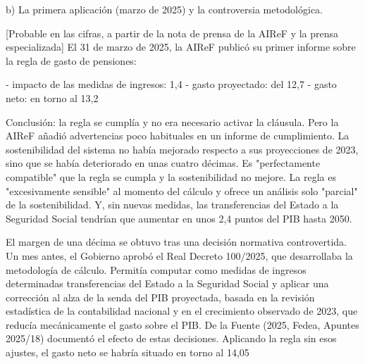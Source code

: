 \documentclass[10pt,a4paper]{article}
\begin{document}
b) La primera aplicación (marzo de 2025) y la controversia metodológica.

[Probable en las cifras, a partir de la nota de prensa de la AIReF y la prensa especializada] El 31 de marzo de 2025, la AIReF publicó su primer informe sobre la regla de gasto de pensiones:

- impacto de las medidas de ingresos: 1,4%
- gasto proyectado: del 12,7%
- gasto neto: en torno al 13,2%

Conclusión: la regla se cumplía y no era necesario activar la cláusula. Pero la AIReF añadió advertencias poco habituales en un informe de cumplimiento. La sostenibilidad del sistema no había mejorado respecto a sus proyecciones de 2023, sino que se había deteriorado en unas cuatro décimas. Es "perfectamente compatible" que la regla se cumpla y la sostenibilidad no mejore. La regla es "excesivamente sensible" al momento del cálculo y ofrece un análisis solo "parcial" de la sostenibilidad. Y, sin nuevas medidas, las transferencias del Estado a la Seguridad Social tendrían que aumentar en unos 2,4 puntos del PIB hasta 2050.

El margen de una décima se obtuvo tras una decisión normativa controvertida. Un mes antes, el Gobierno aprobó el Real Decreto 100/2025, que desarrollaba la metodología de cálculo. Permitía computar como medidas de ingresos determinadas transferencias del Estado a la Seguridad Social y aplicar una corrección al alza de la senda del PIB proyectada, basada en la revisión estadística de la contabilidad nacional y en el crecimiento observado de 2023, que reducía mecánicamente el gasto sobre el PIB. De la Fuente (2025, Fedea, Apuntes 2025/18) documentó el efecto de estas decisiones. Aplicando la regla sin esos ajustes, el gasto neto se habría situado en torno al 14,05%
\end{document}
